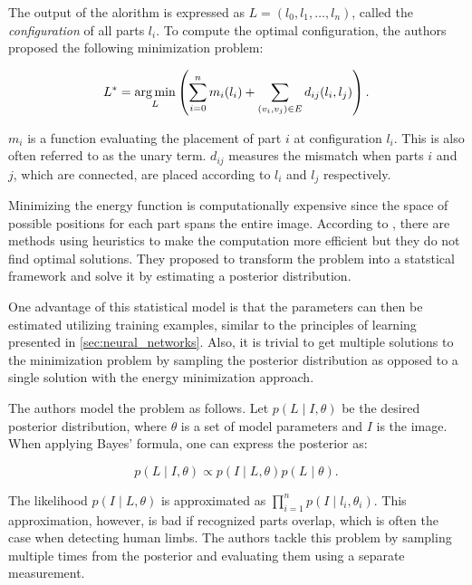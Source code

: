 The output of the alorithm is expressed as $L = (l_0, l_1, \dots, l_n)$, called the \textit{configuration} of all parts $l_i$.
To compute the optimal configuration, the authors proposed the following minimization problem:

\begin{equation}
    \label{eq:energy-minimization}
    L^* = \operatorname*{arg\,min}_L \left(\sum_{i=0}^n m_i(l_i) + \sum_{(v_i, v_j) \in E} d_{ij}(l_i, l_j)\right).
\end{equation}

$m_i$ is a function evaluating the placement of part $i$ at configuration $l_i$.
This is also often referred to as the unary term.
$d_{ij}$ measures the mismatch when parts $i$ and $j$, which are connected, are placed according to $l_i$ and $l_j$ respectively.

Minimizing the energy function is computationally expensive since the space of possible positions for each part spans the entire image.
According to \cite{felzenszwalb_pictorial_2005}, there are methods using heuristics to make the computation more efficient but they do not find optimal solutions.
They proposed to transform the problem into a statstical framework and solve it by estimating a posterior distribution.

One advantage of this statistical model is that the parameters can then be estimated utilizing training examples, similar to the principles of learning presented in \ref{sec:neural_networks}.
Also, it is trivial to get multiple solutions to the minimization problem by sampling the posterior distribution as opposed to a single solution with the energy minimization approach.

The authors model the problem as follows.
Let $p(L \mid I, \theta)$ be the desired posterior distribution, where $\theta$ is a set of model parameters and $I$ is the image.
When applying Bayes' formula, one can express the posterior as:

\begin{equation}
    p(L \mid I, \theta) \propto p(I \mid L, \theta) p(L \mid \theta).
\end{equation}

The likelihood $p(I \mid L, \theta)$ is approximated as $\prod_{i=1}^n p(I \mid l_i, \theta_i)$.
This approximation, however, is bad if recognized parts overlap, which is often the case when detecting human limbs.
The authors tackle this problem by sampling multiple times from the posterior and evaluating them using a separate measurement.

